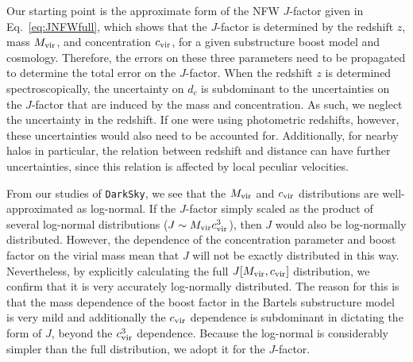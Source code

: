 Our starting point is the approximate form of the NFW $J$-factor given in Eq.~\ref{eq:JNFWfull}, which shows that the $J$-factor is determined by the redshift  $z$, mass $M_{\rm vir}$, and concentration $c_{\rm vir}$, for a given substructure boost model and cosmology.  Therefore, the errors on these three parameters need to be propagated to determine the total error on the $J$-factor.  When the redshift $z$ is determined spectroscopically, the uncertainty on $d_c$ is  subdominant to the uncertainties on the $J$-factor that are induced by the mass and concentration. As such, we neglect the uncertainty in the redshift. If one were using photometric redshifts, however, these uncertainties would also need to be accounted for.  Additionally, for nearby halos in particular, the relation between redshift and distance can have further uncertainties, since this relation is affected by local peculiar velocities.  

From our studies of \texttt{DarkSky}, we see that the $M_{\rm vir}$ and $c_{\rm vir}$ distributions are well-approximated as log-normal. If the $J$-factor simply scaled as the product of several log-normal distributions ($J \sim M_{\rm vir} c_{\rm vir}^3$), then $J$ would also be log-normally distributed.  However, the dependence of the concentration parameter and boost factor on the virial mass mean that $J$ will not be exactly distributed in this way. Nevertheless, by explicitly calculating the full $J[M_{\rm vir}, c_{\rm vir}]$ distribution, we confirm that it is very accurately log-normally distributed. The reason for this is that the mass dependence of the boost factor in the Bartels substructure model~\cite{Bartels:2015uba} is very mild and additionally the $c_{\rm vir}$ dependence is subdominant in dictating the form of $J$, beyond the $c_{\rm vir}^3$ dependence.  Because the log-normal is  considerably simpler than the full distribution, we adopt it for the $J$-factor.


